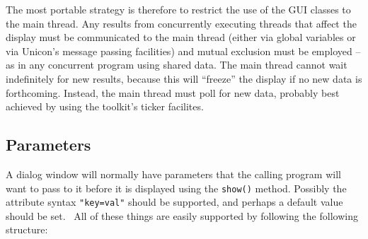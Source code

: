 The most portable strategy is therefore to restrict the use of the GUI classes to the main
thread. Any results from concurrently executing threads that affect the display must be
communicated to the main thread (either via global variables or via Unicon's message
passing facilities) and mutual exclusion must be employed -- as in any concurrent program
using shared data. The main thread cannot wait indefinitely for new results, because this
will ``freeze'' the display if no new data is forthcoming. Instead, the main thread must
poll for new data, probably best achieved by using the toolkit's ticker facilites.

\subsection*{Parameters}

A dialog window will normally have parameters that the calling program will want
to pass to it before it is displayed using the \texttt{show()} method. Possibly
the attribute syntax \texttt{"key=val"} should be
supported, and perhaps a default value should be set. \ All of these things are
easily supported by following the following structure:


